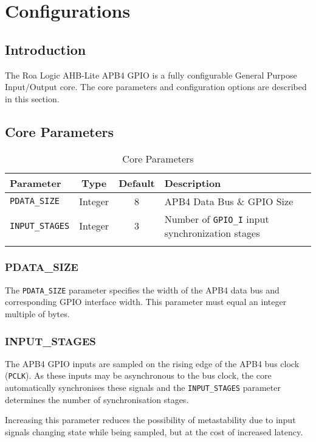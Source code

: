 \chapter{Configurations}\label{configurations}

\section{Introduction}\label{introduction-1}

The Roa Logic AHB-Lite APB4 GPIO is a fully configurable General Purpose
Input/Output core. The core parameters and configuration options are
described in this section.

\section{Core Parameters}\label{core-parameters}

\begin{longtable}[]{@{}lccl@{}}
\toprule
Parameter & Type & Default & Description\tabularnewline
\midrule
\endhead
\texttt{PDATA\_SIZE} & Integer & 8 & APB4 Data Bus \& GPIO Size\tabularnewline
\texttt{INPUT\_STAGES} & Integer & 3 & Number of \texttt{GPIO\_I} input synchronization
stages\tabularnewline
\bottomrule
\caption{Core Parameters}
\end{longtable}

\subsection{PDATA\_SIZE}\label{pdata_size}

The \texttt{PDATA\_SIZE} parameter specifies the width of the APB4 data bus and
corresponding GPIO interface width. This parameter must equal an integer
multiple of bytes.

\subsection{INPUT\_STAGES}\label{input_stages}

The APB4 GPIO inputs are sampled on the rising edge of the APB4 bus
clock (\texttt{PCLK}). As these inputs may be asynchronous to the bus clock, the
core automatically synchronises these signals and the \texttt{INPUT\_STAGES}
parameter determines the number of synchronisation stages.

Increasing this parameter reduces the possibility of metastability due
to input signals changing state while being sampled, but at the cost of
increased latency.

